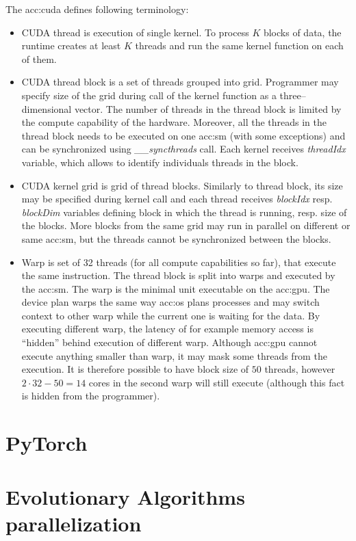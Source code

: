 The \acrshort{acc:cuda} defines following terminology:
\begin{itemize}
    \item CUDA thread is execution of single kernel. To process $K$ blocks of data, the runtime creates at least $K$ threads and run the same kernel function on each of them.
    \item CUDA thread block is a set of threads grouped into grid. Programmer may specify size of the grid during call of the kernel function as a three--dimensional vector. The number of threads in the thread block is limited by the compute capability of the hardware. Moreover, all the threads in the thread block needs to be executed on one \acrshort{acc:sm} (with some exceptions) and can be synchronized using \textit{\_\_syncthreads} call. Each kernel receives \textit{threadIdx} variable, which allows to identify individuals threads in the block.
    \item CUDA kernel grid is grid of thread blocks. Similarly to thread block, its size may be specified during  kernel call and each thread receives \textit{blockIdx} resp. \textit{blockDim} variables defining block in which the thread is running, resp. size of the blocks. More blocks from the same grid may run in parallel on different or same \acrshort{acc:sm}, but the threads cannot be synchronized between the blocks.
    \item Warp is set of 32 threads (for all compute capabilities so far), that execute the same instruction. The thread block is split into warps and executed by the \acrshort{acc:sm}. The warp is the minimal unit executable on the \acrshort{acc:gpu}. The device plan warps the same way \acrshort{acc:os} plans processes and may switch context to other warp while the current one is waiting for the data. By executing different warp, the latency of for example memory access is \enquote{hidden} behind execution of different warp. Although \acrshort{acc:gpu} cannot execute anything smaller than warp, it may mask some threads from the execution. It is therefore possible to have block size of $50$ threads, however $2\cdot32 - 50=14$ cores in the second warp will still execute (although this fact is hidden from the programmer).
\end{itemize}





\section{PyTorch}




\section{Evolutionary Algorithms parallelization}
